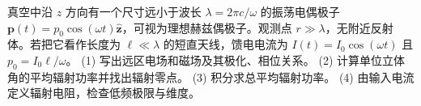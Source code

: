 真空中沿 \(z\) 方向有一个尺寸远小于波长 \(\lambda=2\pi c/\omega\) 的振荡电偶极子 \(\boldsymbol p(t)=p_0\cos(\omega t)\hat{\boldsymbol z}\)，可视为理想赫兹偶极子。观测点 \(r\gg\lambda\)，无附近反射体。若把它看作长度为 \(\ell\ll\lambda\) 的短直天线，馈电电流为 \(I(t)=I_0\cos(\omega t)\) 且 \(p_0=I_0\ell/\omega\)。
(1) 写出远区电场和磁场及其极化、相位关系。
(2) 计算单位立体角的平均辐射功率并找出辐射零点。
(3) 积分求总平均辐射功率。
(4) 由输入电流定义辐射电阻，检查低频极限与维度。
